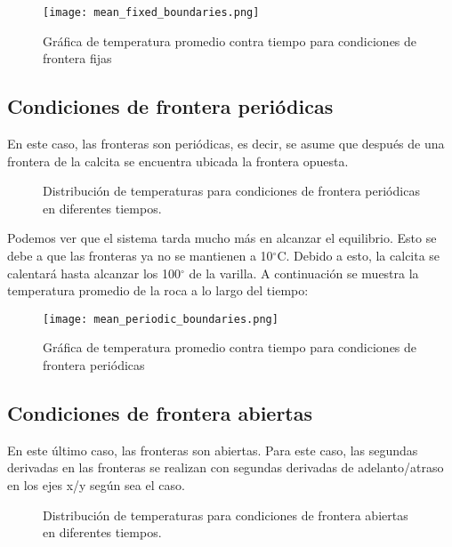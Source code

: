 \documentclass{article}
\begin{document}
\begin{figure}[H]
    \centering
    \texttt{[image: mean\_fixed\_boundaries.png]}
    \caption{Gráfica de temperatura promedio contra tiempo para condiciones de frontera fijas}
    \label{fig:my_label}
\end{figure}

\subsection*{Condiciones de frontera periódicas}
En este caso, las fronteras son periódicas, es decir, se asume que después de una frontera de la calcita se encuentra ubicada la frontera opuesta.
\begin{figure}[H]
    \centering
    \label{fig:my_label}
\end{figure}
\begin{figure}[H]
    \centering 
   \caption{Distribución de temperaturas para condiciones de frontera periódicas en diferentes tiempos.}
    \label{fig:my_label}
\end{figure}

Podemos ver que el sistema tarda mucho más en alcanzar el equilibrio. Esto se debe a que las fronteras ya no se mantienen a 10$^\circ$C. Debido a esto, la calcita se calentará hasta alcanzar los 100$^\circ$ de la varilla. A continuación se muestra la temperatura promedio de la roca a lo largo del tiempo:

\begin{figure}[H]
    \centering
    \texttt{[image: mean\_periodic\_boundaries.png]}
    \caption{Gráfica de temperatura promedio contra tiempo para condiciones de frontera periódicas}
    \label{fig:my_label}
\end{figure}

\subsection*{Condiciones de frontera abiertas}
En este último caso, las fronteras son abiertas. Para este caso, las segundas derivadas en las fronteras se realizan con segundas derivadas de adelanto/atraso en los ejes x/y según sea el caso.
\begin{figure}[H]
    \centering
    \label{fig:my_label}
\end{figure}
\begin{figure}[H]
    \centering 
   \caption{Distribución de temperaturas para condiciones de frontera abiertas en diferentes tiempos.}
    \label{fig:my_label}
\end{figure}
\end{document}
